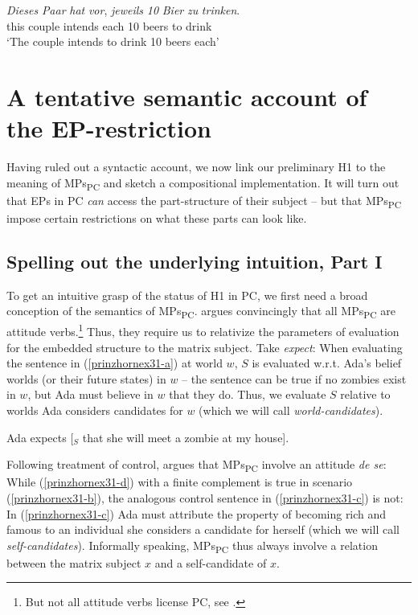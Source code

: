 \documentclass[output=paper,colorlinks,citecolor=brown,
]{langscibook}
\begin{document}
\ea \label{prinzhornex20}
\gll \textit{Dieses} \textit{Paar} \textit{hat} \textit{vor}, \textit{jeweils} \textit{10} \textit{Bier} \textit{zu} \textit{trinken}.\\
this couple intends {} each 10 beers to drink\\
\glt `The couple intends to drink 10 beers each' 
\z



\section{ A tentative semantic account of the EP-restriction}\label{prinzhornsec:4}

Having ruled out a syntactic account, we now link our preliminary H1 to the meaning of MPs\textsubscript{PC} and sketch a compositional implementation. It will turn out that EPs in PC \textit{can} access the part-structure of their subject -- but that MPs\textsubscript{PC} impose certain restrictions on what these parts can look like.



\subsection{Spelling out the underlying intuition, Part I}\label{prinzhornsec:4.1}

To get an intuitive grasp of the status of H1 in PC, we first need a broad conception of the semantics of MPs\textsubscript{PC}. \cite{Pearson:2016} argues convincingly that all MPs\textsubscript{PC} are attitude verbs.\footnote{But not all attitude verbs license PC, see .} Thus, they require us to relativize the parameters of evaluation for the embedded structure to the matrix subject. Take \textit{expect}: When evaluating the sentence in (\ref{prinzhornex31-a}) at world $w$, $S$ is evaluated w.r.t. Ada's belief worlds (or their future states) in $w$ -- the sentence can be true if no zombies exist in $w$, but Ada must believe in $w$ that they do. Thus, we evaluate $S$ relative to worlds  Ada considers candidates for $w$ (which we will call \emph{world-candidates}).

\ea  \label{prinzhornex31-a} Ada expects [$_{S}$ that she will meet a zombie at my house]. \z

Following  \cite{Chierchia:1989} treatment of control, \cite{Pearson:2016} argues that MPs\textsubscript{PC} involve an attitude \textit{de se}: While (\ref{prinzhornex31-d}) with a finite complement is true in scenario (\ref{prinzhornex31-b}), the analogous control sentence  in (\ref{prinzhornex31-c}) is not: In (\ref{prinzhornex31-c}) Ada must attribute the property of becoming rich and famous to an individual she considers a candidate for herself (which we will call \emph{self-candidates}). Informally speaking, MPs\textsubscript{PC} thus always involve a relation between the matrix subject $x$ and a self-candidate of $x$.
\end{document}
